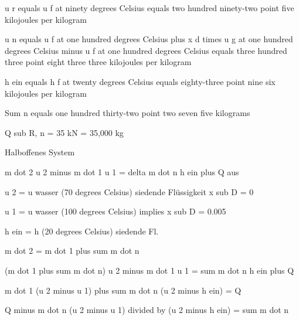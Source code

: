 u r equals u f at ninety degrees Celsius equals two hundred ninety-two point five kilojoules per kilogram

u n equals u f at one hundred degrees Celsius plus x d times u g at one hundred degrees Celsius minus u f at one hundred degrees Celsius equals three hundred three point eight three three kilojoules per kilogram

h ein equals h f at twenty degrees Celsius equals eighty-three point nine six kilojoules per kilogram

Sum n equals one hundred thirty-two point two seven five kilograms

Q sub R, n = 35 kN = 35,000 kg

Halboffenes System

m dot 2 u 2 minus m dot 1 u 1 = delta m dot n h ein plus Q aus

u 2 = u wasser (70 degrees Celsius) siedende Flüssigkeit x sub D = 0

u 1 = u wasser (100 degrees Celsius) implies x sub D = 0.005

h ein = h (20 degrees Celsius) siedende Fl.

m dot 2 = m dot 1 plus sum m dot n

(m dot 1 plus sum m dot n) u 2 minus m dot 1 u 1 = sum m dot n h ein plus Q

m dot 1 (u 2 minus u 1) plus sum m dot n (u 2 minus h ein) = Q

Q minus m dot n (u 2 minus u 1) divided by (u 2 minus h ein) = sum m dot n